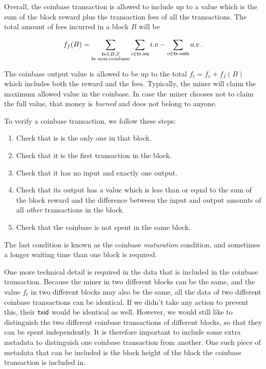 Overall, the coinbase transaction is allowed to include up to a value which is the sum of
the block reward plus the transaction fees of all the transactions. The total amount of fees
incurred in a block $B$ will be

\[
    f_f(B) = \sum_{\substack{\mathsf{tx} \in B\textsf{.}\overline{x}\\\mathsf{tx} \text{ non-coinbase}}}{\sum_{i \in \mathsf{tx}\textsf{.ins}} i.v - \sum_{o \in \mathsf{tx}\textsf{.outs}} o.v}\,.
\]

The coinbase output value is allowed to be up to the total $f_t = f_r + f_f(B)$ which includes both
the reward and the fees. Typically, the miner will claim the maximum allowed value in the coinbase.
In case the miner chooses not to claim the full value, that money is \emph{burned} and does not belong
to anyone.

To verify a coinbase transaction, we follow these steps:
\begin{enumerate}
    \item Check that is is the only one in that block.
    \item Check that it is the first transaction in the block.
    \item Check that it has no input and exactly one output.
    \item Check that its output has a value which is less than or equal to the sum of the block reward and the difference between the input and output amounts of all \emph{other} transactions in the block.
    \item Check that the coinbase is not spent in the same block.
\end{enumerate}

The last condition is known as the coinbase \emph{maturation} condition,
and sometimes a longer waiting time than one block is required.

One more technical detail is required in the data that is included in the coinbase transaction.
Because the miner in two different blocks can be the same, and the value $f_t$ in two different
blocks may also be the same, all the data of two different coinbase transactions can be identical.
If we didn't take any action to prevent this, their $\mathsf{txid}$ would be identical as well.
However, we would still like to distinguish the two different coinbase transactions of different
blocks, so that they can be spent independently. It is therefore important to include some extra
metadata to distinguish one coinbase transaction from another. One such piece of metadata that
can be included is the block height of the block the coinbase transaction is included in.

